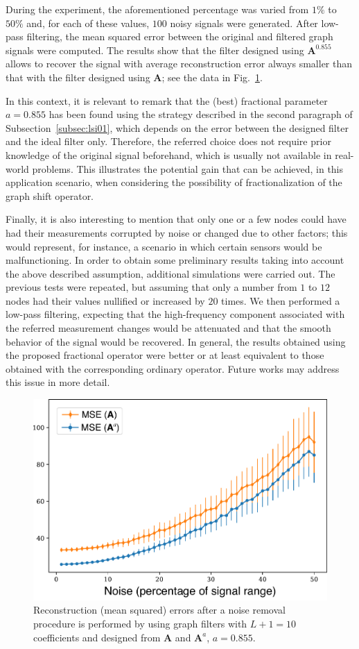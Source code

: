 During the experiment, the aforementioned percentage was varied from $1\%$ to $50\%$ and, for each of these values, $100$ noisy signals were generated. After low-pass filtering, the mean squared error between the original and filtered graph signals were computed. The results show that the filter designed using $\mathbf{A}^{0.855}$ allows to recover the signal with average reconstruction error always smaller than that with the filter designed using $\mathbf{A}$; see the data in Fig.~\ref{fig:usa05}.

{In this context, it is relevant to remark that the (best) fractional parameter $a=0.855$ has been found using the strategy described in the second paragraph of Subsection~\ref{subsec:lsi01}, which depends on the error between the designed filter and the ideal filter only. Therefore, the referred choice does not require prior knowledge of the original signal beforehand, which is usually not available in real-world problems.} This illustrates the potential gain that can be achieved, in this application scenario, when considering the possibility of fractionalization of the graph shift operator.

    {Finally, it is also interesting to mention that only one or a few nodes could have had their measurements corrupted by noise or changed due to other factors; this would represent, for instance, a scenario in which certain sensors would be malfunctioning. In order to obtain some preliminary results taking into account the above described assumption, additional simulations were carried out. The previous tests were repeated, but assuming that only a number from $1$ to $12$ nodes had their values nullified or increased by $20$ times. We then performed a low-pass filtering, expecting that the high-frequency component associated with the referred measurement changes would be attenuated and that the smooth behavior of the signal would be recovered. In general, the results obtained using the proposed fractional operator were better or at least equivalent to those obtained with the corresponding ordinary operator. Future works may address this issue in more detail.}

\begin{figure}[t!]
    \centering
    \includegraphics[width=0.7\linewidth]{Figures/ERROR_errobar_filtrados.pdf}
    \caption{Reconstruction (mean squared) errors after a noise removal procedure is performed by using graph filters with $L+1=10$ coefficients and designed from $\mathbf{A}$ and $\mathbf{A}^a$, $a=0.855$.}%
    \label{fig:usa05}%
    \vspace{-0.1cm}
\end{figure}

